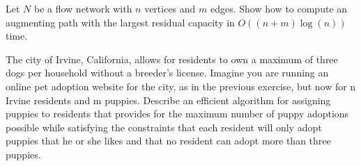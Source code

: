 \documentclass{common/cs157}
\begin{document}
\begin{problem}{2}

Let $N$ be a flow network with $n$ vertices and $m$ edges. Show how to compute an
augmenting path with the largest residual capacity in $O((n + m) \log(n))$ time.

\end{problem}

\begin{problem}{3}

The city of Irvine, California, allows for residents to own a maximum of three
dogs per household without a breeder’s license. Imagine you are running an
online pet adoption website for the city, as in the previous exercise, but now
for n Irvine residents and m puppies. Describe an efficient algorithm for assigning puppies to residents that provides for the maximum number of puppy adoptions possible while satisfying the constraints that each resident will only
adopt puppies that he or she likes and that no resident can adopt more than three
puppies.

\end{problem}
\newpage
\end{document}
